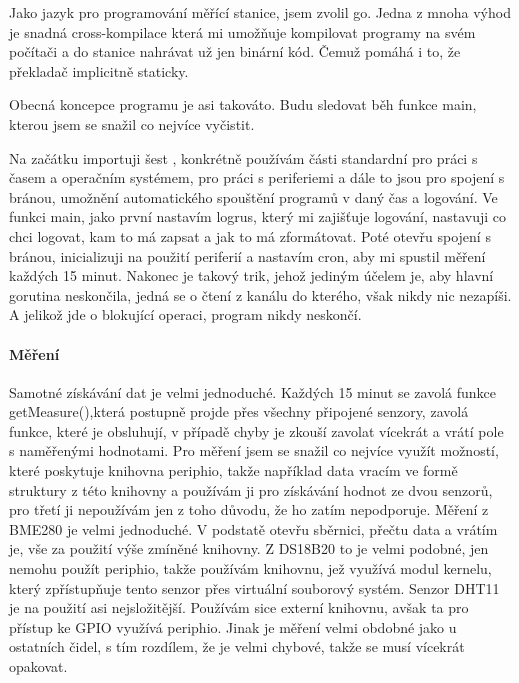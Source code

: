 Jako jazyk pro programování měřící stanice, jsem zvolil \gls{go}. Jedna z mnoha výhod je snadná \gls{cross-kompilace} 
která mi umožňuje kompilovat programy na svém počítači a do stanice nahrávat už jen binární kód. Čemuž pomáhá i to, že 
překladač implicitně  staticky.

Obecná koncepce programu je asi takováto. Budu sledovat běh funkce main, kterou jsem se snažil co nejvíce vyčistit.



Na začátku importuji šest , konkrétně používám části standardní  
pro práci s časem a operačním systémem,  pro práci s periferiemi a dále to jsou 
 pro spojení s bránou, umožnění automatického spouštění programů v daný čas a logování. Ve 
funkci main, jako první nastavím  logrus, který mi zajišťuje logování, nastavuji co chci 
logovat, kam to má zapsat a jak to má zformátovat. Poté otevřu spojení s bránou, inicializuji 
 na použití periferií a nastavím cron, aby mi spustil měření každých 15 minut. Nakonec je 
takový trik, jehož jediným účelem je, aby hlavní gorutina neskončila, jedná se o čtení z kanálu do kterého, však nikdy 
nic nezapíši. A jelikož jde o blokující operaci, program nikdy neskončí.


\paragraph*{Měření}
Samotné získávání dat je velmi jednoduché. Každých 15 minut se zavolá funkce getMeasure(),která postupně projde přes 
všechny připojené senzory, zavolá funkce, které je obsluhují, v případě chyby je zkouší zavolat vícekrát a vrátí pole 
s naměřenými hodnotami. Pro měření jsem se snažil co nejvíce využít možností, které poskytuje  \gls{knihovna} 
\gls{periphio}, takže například data vracím ve formě struktury z této knihovny a používám ji pro získávání hodnot ze 
dvou senzorů, pro třetí ji nepoužívám jen z toho důvodu, že ho zatím nepodporuje. Měření z BME280 je velmi jednoduché. 
V podstatě otevřu sběrnici, přečtu data a vrátím je, vše za použití výše zmíněné knihovny. Z DS18B20 to je velmi podobné, 
jen nemohu použít \gls{periphio}, takže používám knihovnu, jež využívá modul kernelu, který zpřístupňuje tento senzor 
přes virtuální souborový systém. Senzor DHT11 je na použití asi nejsložitější. Používám sice externí knihovnu, avšak ta 
pro přístup ke GPIO využívá \gls{periphio}. Jinak je měření velmi obdobné jako u ostatních čidel, s tím rozdílem, že je 
velmi chybové, takže se musí vícekrát opakovat.

